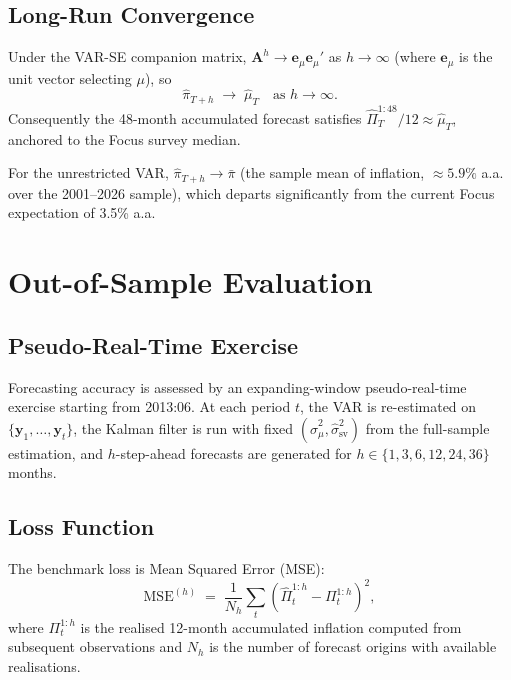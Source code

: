 \documentclass[12pt, a4paper]{article}
\newcommand{\bs}[1]{\boldsymbol{#1}}
\begin{document}
\subsection{Long-Run Convergence}

Under the VAR-SE companion matrix, $\bs{A}^h \to \bs{e}_\mu\bs{e}_\mu'$ as
$h\to\infty$ (where $\bs{e}_\mu$ is the unit vector selecting $\mu$), so
\begin{equation}
    \widehat{\pi}_{T+h} \;\to\; \hat\mu_T \quad \text{as } h\to\infty.
\end{equation}
Consequently the 48-month accumulated forecast satisfies
$\widehat{\Pi}_T^{1:48}/12 \approx \hat\mu_T$, anchored to the Focus
survey median.

For the unrestricted VAR, $\widehat{\pi}_{T+h}\to\bar\pi$ (the sample mean
of inflation, $\approx 5.9\%$ a.a. over the 2001--2026 sample), which
departs significantly from the current Focus expectation of 3.5\% a.a.

\section{Out-of-Sample Evaluation}
\label{sec:oos}

\subsection{Pseudo-Real-Time Exercise}

Forecasting accuracy is assessed by an expanding-window pseudo-real-time
exercise starting from 2013:06. At each period $t$, the VAR is re-estimated
on $\{\bs{y}_1,\ldots,\bs{y}_t\}$, the Kalman filter is run with fixed
$(\hat\sigma^2_\mu,\hat\sigma^2_{\mathrm{sv}})$ from the full-sample
estimation, and $h$-step-ahead forecasts are generated for
$h\in\{1,3,6,12,24,36\}$ months.

\subsection{Loss Function}

The benchmark loss is Mean Squared Error (MSE):
\begin{equation}
    \mathrm{MSE}^{(h)} \;=\; \frac{1}{N_h}\sum_{t}\left(
        \widehat{\Pi}_{t}^{1:h} - \Pi_{t}^{1:h}\right)^2,
\end{equation}
where $\Pi_t^{1:h}$ is the realised 12-month accumulated inflation computed
from subsequent observations and $N_h$ is the number of forecast origins with
available realisations.
\end{document}
